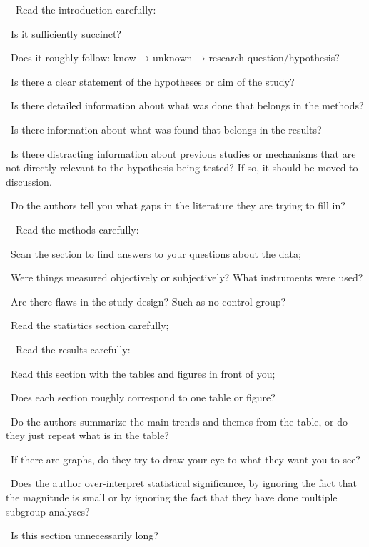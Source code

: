 \documentclass[a4paper, 12pt]{article}
\begin{document}
\par\ \textbullet\ Read the introduction carefully:
\par\quad\textopenbullet\ Is it sufficiently succinct?
\par\quad\textopenbullet\ Does it roughly follow: know → unknown → research question/hypothesis?
\par\quad\textopenbullet\ Is there a clear statement of the hypotheses or aim of the study?
\par\quad\textopenbullet\ Is there detailed information about what was done that belongs in the methods?
\par\quad\textopenbullet\ Is there information about what was found that belongs in the results?
\par\quad\textopenbullet\ Is there distracting information about previous studies or mechanisms that are not directly relevant to the hypothesis being tested?
If so, it should be moved to discussion.
\par\quad\textopenbullet\ Do the authors tell you what gaps in the literature they are trying to fill in?

\par\ \textbullet\ Read the methods carefully:
\par\quad\textopenbullet\ Scan the section to find answers to your questions about the data;
\par\quad\textopenbullet\ Were things measured objectively or subjectively? What instruments were used?
\par\quad\textopenbullet\ Are there flaws in the study design? Such as no control group?
\par\quad\textopenbullet\ Read the statistics section carefully;

\newpage\par\ \textbullet\ Read the results carefully:
\par\quad\textopenbullet\ Read this section with the tables and figures in front of you;
\par\quad\textopenbullet\ Does each section roughly correspond to one table or figure?
\par\quad\textopenbullet\ Do the authors summarize the main trends and themes from the table, or do they just repeat what is in the table?
\par\quad\textopenbullet\ If there are graphs, do they try to draw your eye to what they want you to see?
\par\quad\textopenbullet\ Does the author over-interpret statistical significance,
by ignoring the fact that the magnitude is small or by ignoring the fact that they have done multiple subgroup analyses?
\par\quad\textopenbullet\ Is this section unnecessarily long?
\end{document}
